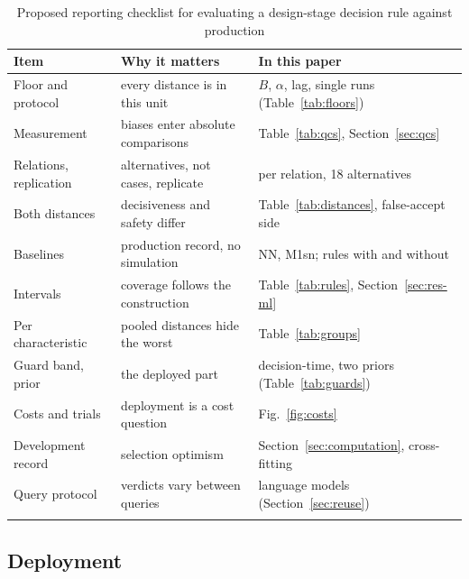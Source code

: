 \documentclass[pdflatex,sn-basic,lineno]{sn-jnl}
\newcommand{\tabsize}{\fontsize{8}{9.5}\selectfont}
\begin{document}
\begin{table}[t]
\tabsize
\setlength{\tabcolsep}{3pt}
\caption{Proposed reporting checklist for evaluating a design-stage decision rule against production}\label{tab:checklist}
\begin{tabular}{@{}L{2.7cm}L{4.7cm}L{5.0cm}@{}}
\toprule
Item & Why it matters & In this paper \\
\midrule
Floor and protocol & every distance is in this unit & $B$, $\alpha$, lag, single runs (Table~\ref{tab:floors}) \\
Measurement & biases enter absolute comparisons & Table~\ref{tab:qcs}, Section~\ref{sec:qcs} \\
Relations, replication & alternatives, not cases, replicate & per relation, 18 alternatives \\
Both distances & decisiveness and safety differ & Table~\ref{tab:distances}, false-accept side \\
Baselines & production record, no simulation & NN, M1sn; rules with and without \\
Intervals & coverage follows the construction & Table~\ref{tab:rules}, Section~\ref{sec:res-ml} \\
Per characteristic & pooled distances hide the worst & Table~\ref{tab:groups} \\
Guard band, prior & the deployed part & decision-time, two priors (Table~\ref{tab:guards}) \\
Costs and trials & deployment is a cost question & Fig.~\ref{fig:costs} \\
Development record & selection optimism & Section~\ref{sec:computation}, cross-fitting \\
Query protocol & verdicts vary between queries & language models (Section~\ref{sec:reuse}) \\
\botrule
\end{tabular}
\end{table}

\subsection{Deployment}
\end{document}
